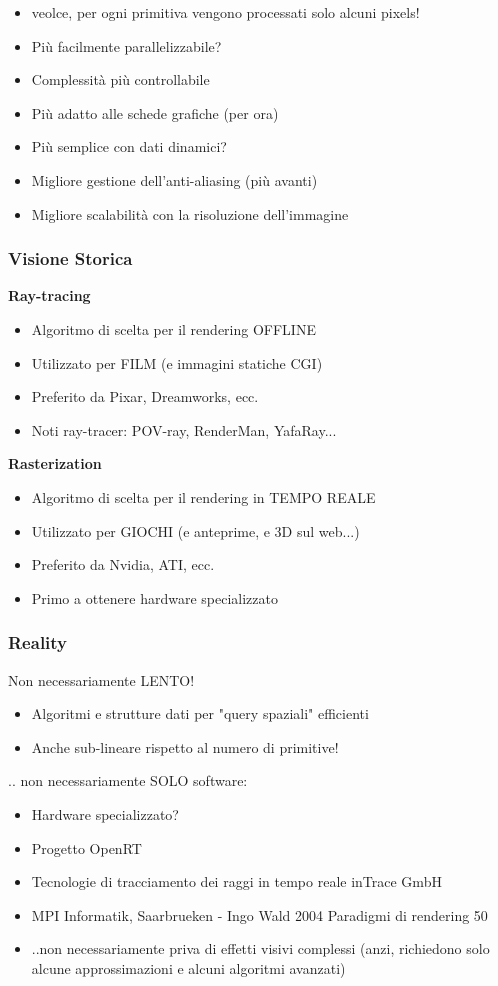 \begin{itemize}
    \item veolce, per ogni primitiva vengono processati solo alcuni pixels!
    \item Più facilmente parallelizzabile?
    \item Complessità più controllabile
    \item Più adatto alle schede grafiche (per ora)
    \item Più semplice con dati dinamici?
    \item Migliore gestione dell'anti-aliasing (più avanti)
    \item Migliore scalabilità con la risoluzione dell'immagine
\end{itemize}
\subsubsection{Visione Storica}
\textbf{Ray-tracing}
\begin{itemize}
    \item Algoritmo di scelta per il rendering OFFLINE
    \item Utilizzato per FILM (e immagini statiche CGI)
    \item Preferito da Pixar, Dreamworks, ecc.
    \item Noti ray-tracer: POV-ray, RenderMan, YafaRay...
\end{itemize}

\textbf{Rasterization}
\begin{itemize}
    \item Algoritmo di scelta per il rendering in TEMPO REALE
    \item Utilizzato per GIOCHI (e anteprime, e 3D sul web...)
    \item Preferito da Nvidia, ATI, ecc.
    \item Primo a ottenere hardware specializzato
\end{itemize}
\subsubsection{Reality}
Non necessariamente LENTO!
\begin{itemize}
    \item Algoritmi e strutture dati per "query spaziali" efficienti
    \item Anche sub-lineare rispetto al numero di primitive!
\end{itemize}
.. non necessariamente SOLO software:
\begin{itemize}
    \item Hardware specializzato?
    \item Progetto OpenRT
    \item Tecnologie di tracciamento dei raggi in tempo reale inTrace GmbH
    \item MPI Informatik, Saarbrueken - Ingo Wald 2004 Paradigmi di rendering 50
\end{itemize}

\begin{itemize}
    \item ..non necessariamente priva di effetti visivi complessi (anzi, richiedono solo alcune approssimazioni e alcuni algoritmi avanzati)
\end{itemize}
            




